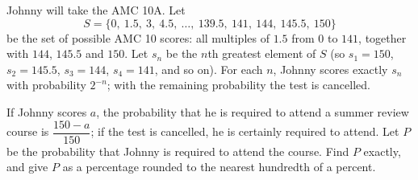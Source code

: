 Johnny will take the AMC 10A. Let
\[S=\{0,\ 1.5,\ 3,\ 4.5,\ \dots,\ 139.5,\ 141,\ 144,\ 145.5,\ 150\}\]
be the set of possible AMC 10 scores: all multiples of $1.5$ from $0$ to $141$, together with $144$, $145.5$ and $150$. Let $s_n$ be the $n$th greatest element of $S$ (so $s_1=150$, $s_2=145.5$, $s_3=144$, $s_4=141$, and so on). For each $n$, Johnny scores exactly $s_n$ with probability $2^{-n}$; with the remaining probability the test is cancelled.

If Johnny scores $a$, the probability that he is required to attend a summer review course is $\dfrac{150-a}{150}$; if the test is cancelled, he is certainly required to attend. Let $P$ be the probability that Johnny is required to attend the course. Find $P$ exactly, and give $P$ as a percentage rounded to the nearest hundredth of a percent.
